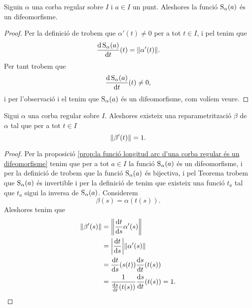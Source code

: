 \documentclass[../Apunts.tex]{subfiles}
\begin{document}
	\begin{proposition}
		\label{prop:la funció longitud arc d'una corba regular és un difeomorfisme}
		Siguin \(\alpha\) una corba regular sobre \(I\) i \(a\in I\) un punt. Aleshores la funció \(\operatorname{S}_{\alpha}(a)\) és un difeomorfisme. %
		\begin{proof}
			Per la definició de  trobem que \(\alpha'(t)\neq0\) per a tot \(t\in I\), i pel  tenim que
			\[\frac{\diff\funciolongituddarc_{\alpha}(a)}{\diff t}(t)=\norm{\alpha'(t)}.\]
			Per tant trobem que %
			\[\frac{\mathrm{d}\operatorname{S}_{\alpha}(a)}{\mathrm{d} t}(t)\neq0,\]
			i per l'observació  i el \corollari{}  tenim que \(\operatorname{S}_{\alpha}(a)\) és un difeomorfisme, com volíem veure. %
		\end{proof}
	\end{proposition}
	\begin{proposition} %
		\label{prop:podem trobar una reparametrització amb velocitat unitaria de qualsevol corba regular}
		Sigui \(\alpha\) una corba regular sobre \(I\). Aleshores existeix una reparametrització \(\beta\) de \(\alpha\) tal que per a tot \(t\in I\)
		\[\norm{\beta'(t)}=1.\]
		\begin{proof}
			Per la proposició \ref{prop:la funció longitud arc d'una corba regular és un difeomorfisme} tenim que per a tot \(a\in I\) la funció \(\operatorname{S}_{\alpha}(a)\) és un difeomorfisme, i per la definició de  trobem que la funció \(\operatorname{S}_{\alpha}(a)\) és bijectiva, i pel Teorema  trobem que \(\operatorname{S}_{\alpha}(a)\) és invertible i per la definició de  tenim que existeix una funció \(t_{a}\) tal que \(t_{a}\) sigui la inversa de \(\operatorname{S}_{\alpha}(a)\). Considerem
			\[\beta(s)=\alpha(t(s)).\]
			Aleshores tenim que
			\begin{align*} %
				\norm{\beta'(s)}&=\norm{\frac{\diff t}{\diff s}\alpha'(s)} \\
				&=\abs{\frac{\diff t}{\diff s}}\norm{\alpha'(s)} \\
				&=\frac{\diff t}{\diff s}(s(t))\frac{\diff s}{\diff t}(t(s))\\
				&=\frac{1}{\frac{\diff s}{\diff t}(t(s))}\frac{\diff s}{\diff t}(t(s))=1. \qedhere
			\end{align*}
		\end{proof}
	\end{proposition}
\end{document}

